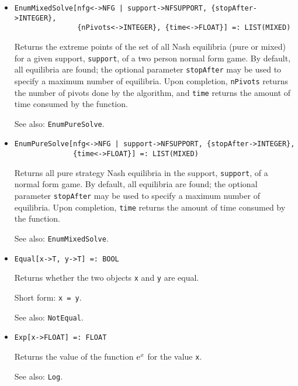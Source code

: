 \begin{itemize}
\item
\protect \large \begin{verbatim}
EnumMixedSolve[nfg<->NFG | support->NFSUPPORT, {stopAfter->INTEGER},
               {nPivots<->INTEGER}, {time<->FLOAT}] =: LIST(MIXED)
\end{verbatim}\normalsize

\bd
Returns the extreme points of the set of all Nash equilibria (pure or
mixed) for a given support, \verb+support+, of a two person normal form
game.  By default, all equilibria are found; the optional parameter
\verb+stopAfter+ may be used to specify a maximum number of
equilibria.  Upon completion, \verb+nPivots+ returns the number of
pivots done by the algorithm, and
\verb+time+ returns the amount of time consumed by the function.
\item
[See also:] {\tt EnumPureSolve}.
\ed

\item
\protect \large \begin{verbatim}
EnumPureSolve[nfg<->NFG | support->NFSUPPORT, {stopAfter->INTEGER}, 
              {time<->FLOAT}] =: LIST(MIXED) 
\end{verbatim}\normalsize

\bd
Returns all pure strategy Nash equilibria in the support, \verb+support+,
of a normal form game.  By default, all equilibria are found; the optional
parameter \verb+stopAfter+ may be used to specify a maximum number of
equilibria.  Upon completion, \verb+time+ returns the amount of time
consumed by the function. 
\item
[See also:] {\tt EnumMixedSolve}.
\ed

\item
\protect \large \begin{verbatim}
Equal[x->T, y->T] =: BOOL
\end{verbatim}\normalsize

\bd
Returns whether the two objects \verb+x+ and \verb+y+ are
equal.
\item
[Short form:] \verb+x = y+.
\item
[See also:] {\tt NotEqual}.
\ed

\item
\protect \large \begin{verbatim}
Exp[x->FLOAT] =: FLOAT
\end{verbatim} \normalsize

\bd
Returns the value of the function ${\rm e}^{x}$ for the
value \verb+x+.
\item
[See also:] {\tt Log}.
\ed



\end{itemize}

